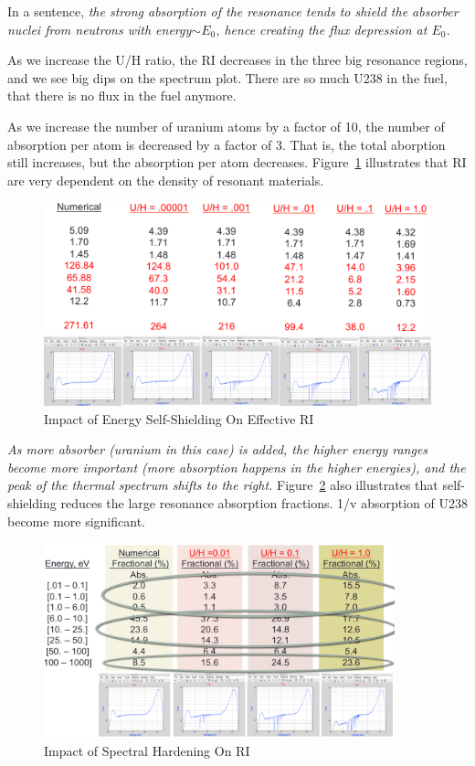 \documentclass{school-22.211-notes}
\begin{document}
In a sentence, \textit{the strong absorption of the resonance tends to shield the absorber nuclei from neutrons with energy$\sim E_0$, hence creating the flux depression at $E_0$.}

As we increase the U/H ratio, the RI decreases in the three big resonance regions, and we see big dips on the spectrum plot. There are so much U238 in the fuel, that there is no flux in the fuel anymore. 

As we increase the number of uranium atoms by a factor of 10, the number of absorption per atom is decreased by a factor of 3. That is, the total aborption still increases, but the absorption per atom decreases. Figure~\ref{self-shielding} illustrates that RI are very dependent on the density of resonant materials.
\begin{figure}
  \centering
  \includegraphics[width=4.5in]{images/self-shielding.png}
  \caption{Impact of Energy Self-Shielding On Effective RI} \label{self-shielding}
\end{figure}

\clearpage
\textit{As more absorber (uranium in this case) is added, the higher energy ranges become more important (more absorption happens in the higher energies), and the peak of the thermal spectrum shifts to the right.} Figure~\ref{spectral-hardening} also illustrates that self-shielding reduces the large resonance absorption fractions. 1/v absorption of U238 become more significant. 
\begin{figure}
  \centering
  \includegraphics[width=4in]{images/spectral-hardening.png}
  \caption{Impact of Spectral Hardening On RI} \label{spectral-hardening}
\end{figure}
\end{document}
